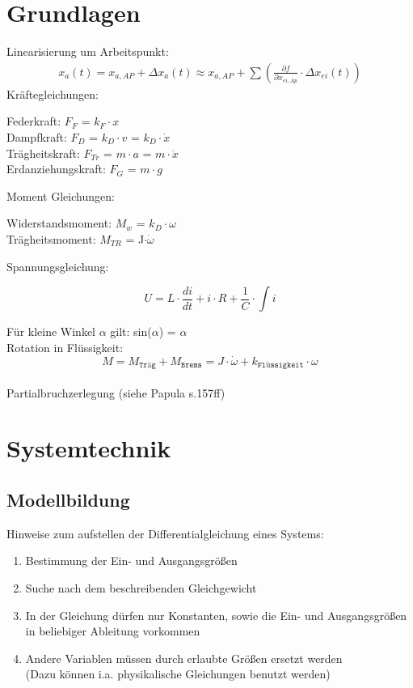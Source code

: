 \documentclass[10pt,a4paper]{article}
\begin{document}
\twocolumn
\pagestyle{fancy}

\section{Grundlagen}
Linearisierung um Arbeitspunkt:
\begin{align*}
	x_{a}(t)=x_{a,AP}+\Delta x_{a}(t) \approx x_{a,AP}+\sum\left(\frac{\partial f}
	{\partial x_{ei,Ap}} \cdot \Delta x_{ei}(t)\right)
\end{align*}
Kräftegleichungen:
\begin{mdframed}[style=exercise]
	Federkraft: $F_F$ = $k_F \cdot x$\\
	Dampfkraft: $F_D$ = $k_D \cdot v$ = $k_D \cdot \dot{x}$\\
	Trägheitskraft: $F_{Tr}$ = $m\cdot a$ = $m\cdot \ddot{x}$\\
	Erdanziehungskraft: $F_G$ = $m\cdot g$
\end{mdframed}
Moment Gleichungen:
\begin{mdframed}[style=exercise]
	Widerstandsmoment: $M_w$ = $k_D \cdot \omega$\\
	Trägheitsmoment: $M_{TR}$ = J$\cdot \dot{\omega}$
\end{mdframed}
Spannungsgleichung:
\begin{mdframed}[style=exercise]
	\[
		U = L\cdot \frac{di}{dt}+i\cdot R+\frac{1}{C} \cdot \int i
	\]
\end{mdframed}
Für kleine Winkel $\alpha$ gilt: sin($\alpha$) = $\alpha$\\
Rotation in Flüssigkeit:
\[
	M=M_{\texttt{Träg}}+M_{\texttt{Brems}}=J \cdot \dot{\omega} +k_{\texttt{Flüssigkeit}} \cdot \omega
\]\\
Partialbruchzerlegung (siehe Papula s.157ff)

\section{Systemtechnik}
\subsection{Modellbildung}
Hinweise zum aufstellen der Differentialgleichung eines Systems:
\begin{mdframed}[style=exercise]
	\begin{enumerate}
		\item Bestimmung der Ein- und Ausgangsgrößen
		\item Suche nach dem beschreibenden Gleichgewicht
		\item In der Gleichung dürfen nur Konstanten, sowie die Ein- und
		      Ausgangsgrößen in beliebiger Ableitung vorkommen
		\item Andere Variablen müssen durch erlaubte Größen ersetzt werden\\
		      \footnotesize
		      (Dazu können i.a. physikalische Gleichungen benutzt werden)
	\end{enumerate}
\end{mdframed}
\end{document}
